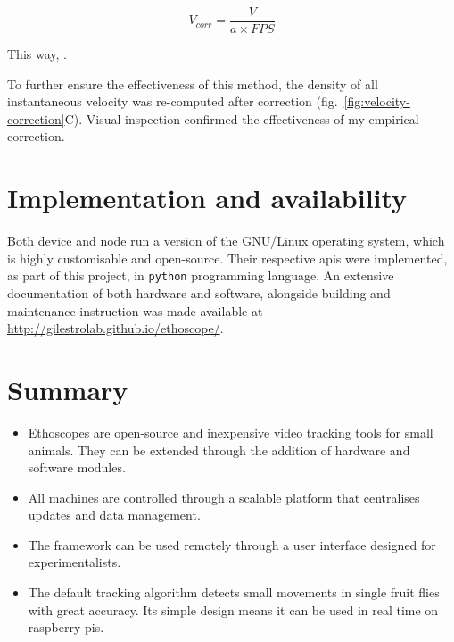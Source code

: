 \begin{equation}
V_{corr} = \frac{V}{a\times{}FPS}
\label{eq:velocor2}
\end{equation}

This way, .


To further ensure the effectiveness of this method, the density of all instantaneous velocity was re-computed after correction (fig.~\ref{fig:velocity-correction}C).
Visual inspection confirmed the effectiveness of my empirical correction.

\section{Implementation and availability}

Both device and node run a version of the GNU/Linux operating system, which is highly customisable and open-source.
Their respective \glspl{api} were implemented, as part of this project, in \texttt{python} programming language.
An extensive documentation of both hardware and software, alongside building and maintenance instruction was made
available at \url{http://gilestrolab.github.io/ethoscope/}.

\newpage
\section{Summary}

\begin{itemize}
	\item Ethoscopes are open-source and inexpensive video tracking tools for small animals. They can be extended through the addition of hardware and software modules.
	\item All machines are controlled through a scalable platform that centralises updates and data management.
	\item The framework can be used remotely through a user interface designed for experimentalists.
	\item The default tracking algorithm detects small movements in single fruit flies with great accuracy.
	Its simple design means it can be used in real time on raspberry pis.
\end{itemize}


